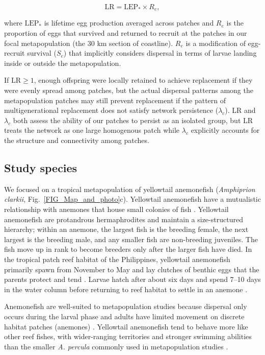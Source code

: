 \documentclass[12pt, oneside]{article}   	%
\begin{document}
\begin{equation}
\text{LR} = \text{LEP}_* \times R_e, \label{EQN_LR}
\end{equation}

where $\text{LEP}_*$ is lifetime egg production averaged across patches and $R_e$ is the proportion of eggs that survived and returned to recruit at the patches in our focal metapopulation (the 30 km section of coastline). $R_e$ is a modification of egg-recruit survival ($S_e$) that implicitly considers dispersal in terms of larvae landing inside or outside the metapopulation. 

If $\text{LR} \geq 1$, enough offspring were locally retained to achieve replacement if they were evenly spread among patches, but the actual dispersal patterns among the metapopulation patches may still prevent replacement if the pattern of multigenerational replacement does not satisfy network persistence ($\lambda_c$). LR and $\lambda_c$ both assess the ability of our patches to persist as an isolated group, but LR treats the network as one large homogenous patch while $\lambda_c$ explicitly accounts for the structure and connectivity among patches.  

\subsection*{Study species}

We focused on a tropical metapopulation of yellowtail anemonefish (\textit{Amphiprion clarkii}, Fig.\ \ref{FIG_Map_and_photo}c). Yellowtail anemonefish have a mutualistic relationship with anemones that house small colonies of fish \citep{buston2003social, fautin1992field}. Yellowtail anemonefish are protandrous hermaphrodites and maintain a size-structured hierarchy; within an anemone, the largest fish is the breeding female, the next largest is the breeding male, and any smaller fish are non-breeding juveniles. The fish move up in rank to become breeders only after the larger fish have died. In the tropical patch reef habitat of the Philippines, yellowtail anemonefish primarily spawn from November to May and lay clutches of benthic eggs that the parents protect and tend \citep{ochi1989mating, holtswarth2017fecundity}. Larvae hatch after about six days and spend 7--10 days in the water column before returning to reef habitat to settle in an anemone \citep{fautin1992field}.

Anemonefish are well-suited to metapopulation studies because dispersal only occurs during the larval phase and adults have limited movement on discrete habitat patches (anemones) \citep[e.g.,][]{buston2013marine, salles_coral_2015, almany2017larval}. Yellowtail anemonefish tend to behave more like other reef fishes, with wider-ranging territories and stronger swimming abilities \citep{hattori1991life, ochi1989mating} than the smaller \textit{A. percula} commonly used in metapopulation studies \citep[e.g.,][]{buston2011probability, salles_coral_2015}. 
\end{document}
